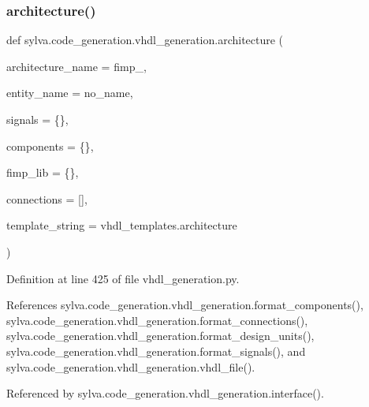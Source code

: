 \subsubsection{\texorpdfstring{architecture()}{architecture()}}
{\footnotesize\ttfamily def sylva.\+code\+\_\+generation.\+vhdl\+\_\+generation.\+architecture (\begin{DoxyParamCaption}\item[{}]{architecture\+\_\+name = {\ttfamily \textquotesingle{}fimp\+\_\textquotesingle{}},  }\item[{}]{entity\+\_\+name = {\ttfamily \textquotesingle{}no\+\_\+name\textquotesingle{}},  }\item[{}]{signals = {\ttfamily \{\}},  }\item[{}]{components = {\ttfamily \{\}},  }\item[{}]{fimp\+\_\+lib = {\ttfamily \{\}},  }\item[{}]{connections = {\ttfamily \mbox{[}\mbox{]}},  }\item[{}]{template\+\_\+string = {\ttfamily vhdl\+\_\+templates.architecture} }\end{DoxyParamCaption})}



Definition at line 425 of file vhdl\+\_\+generation.\+py.



References sylva.\+code\+\_\+generation.\+vhdl\+\_\+generation.\+format\+\_\+components(), sylva.\+code\+\_\+generation.\+vhdl\+\_\+generation.\+format\+\_\+connections(), sylva.\+code\+\_\+generation.\+vhdl\+\_\+generation.\+format\+\_\+design\+\_\+units(), sylva.\+code\+\_\+generation.\+vhdl\+\_\+generation.\+format\+\_\+signals(), and sylva.\+code\+\_\+generation.\+vhdl\+\_\+generation.\+vhdl\+\_\+file().



Referenced by sylva.\+code\+\_\+generation.\+vhdl\+\_\+generation.\+interface().


